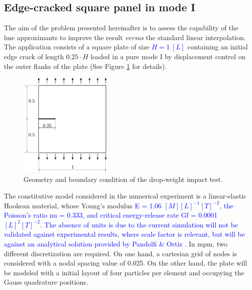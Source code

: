 \documentclass[preprint,12pt,a4paper]{elsarticle}
\newcommand{\MMP}[1]{
  \textcolor{blue}{{#1}}
}
\begin{document}
\subsection{Edge-cracked square panel in mode I}
\label{sec:3.1}
The aim of the problem presented hereinafter is to assess the
capability of the \acrshort{lme} approximants to improve the result
\textit{versus} the standard linear interpolation. The application
consists of a square plate of size\MMP{$H = 1\ [L] $} containing an initial edge
crack of length $0.25 \cdot H$ loaded in a pure mode I by displacement
control on the outer flanks of the plate (See Figure
\ref{fig:geometry-cracked-panel-mode-I} for details). 
\begin{figure}
  \centering
  \includegraphics[width=0.4\textwidth]{Figure-Mode_I}
  \caption{Geometry and boundary condition of the drop-weight impact test.}
  \label{fig:geometry-cracked-panel-mode-I}
\end{figure}
The constitutive model considered in the numerical experiment is a
linear-elastic Hookean material, whose Young's modulus \MMP{\gls{E} = 1.06
$[M] [L]^{-1} [T]^{-2}$, the Poisson's ratio \gls{nu} = 0.333, and
critical energy-release rate \gls{Gf} = 0.0001 $[L]^{2} [T]^{-2}$. The absence of units is due to the current simulation will not be validated against experimental results, where
scale factor is relevant, but will be against an analytical
solution provided by Pandolfi \& Ortiz \cite{Pandolfi_2012}.} In
\acrshort{mpm}, two different discretization are required. On one
hand, a cartesian grid of nodes is considered with a nodal spacing
value of 0.025. On the other hand, the plate will be modeled with a
initial layout of four particles per element and occupying the Gauss
quadrature positions.\\
\end{document}
